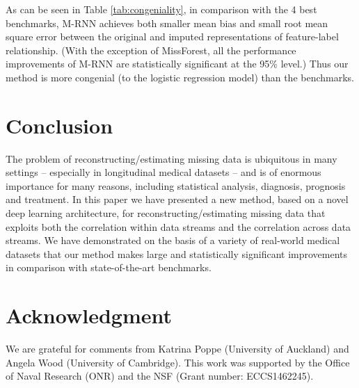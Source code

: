\documentclass{article}
\begin{document}
As can be seen in Table \ref{tab:congeniality}, in comparison with the 4 best benchmarks, M-RNN achieves both smaller mean bias and small root mean square error between the original and imputed representations of feature-label relationship.  (With the exception of MissForest, all the performance improvements of M-RNN are statistically significant at the 95\% level.)  Thus our method is more congenial (to the logistic regression model) than the benchmarks.

\section{Conclusion}
The problem of reconstructing/estimating missing data is ubiquitous in many settings -- especially  in longitudinal medical datasets -- and is of enormous importance for many reasons, including statistical analysis, diagnosis, prognosis and treatment.  In this paper we have presented a new  method, based on a novel deep learning architecture, for reconstructing/estimating missing data that exploits both the correlation within data streams and the correlation across data streams. We have demonstrated on the basis of a variety of real-world medical datasets that our method makes large and statistically significant improvements in comparison with state-of-the-art benchmarks.



\section*{Acknowledgment}
We are grateful for comments from Katrina Poppe (University of Auckland) and Angela Wood (University of Cambridge). This work was supported by the Office of Naval Research (ONR) and the NSF (Grant number: ECCS1462245).
       
\end{document}
